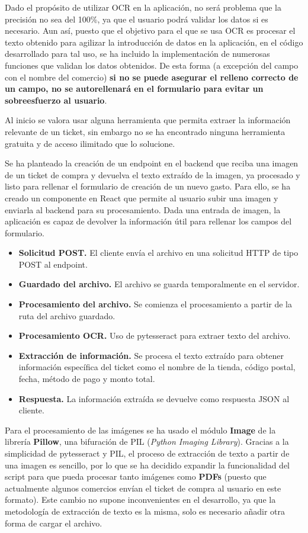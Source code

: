 Dado el propósito de utilizar OCR en la aplicación, no será problema que la precisión no sea del 100\%, ya que el usuario podrá validar los datos si es necesario. Aun así, puesto que el objetivo para el que se usa OCR es procesar el texto obtenido para agilizar la introducción de datos en la aplicación, en el código desarrollado para tal uso, se ha incluido la implementación de numerosas funciones que validan los datos obtenidos. De esta forma (a excepción del campo con el nombre del comercio) \textbf{si no se puede asegurar el relleno correcto de un campo, no se autorellenará en el formulario para evitar un sobreesfuerzo al usuario}.


Al inicio se valora usar alguna herramienta que permita extraer la información relevante de un ticket, sin embargo no se ha encontrado ninguna herramienta gratuita y de acceso ilimitado que lo solucione. 

Se ha planteado la creación de un endpoint en el backend que reciba una imagen de un ticket de compra y devuelva el texto extraído de la imagen, ya procesado y listo para rellenar el formulario de creación de un nuevo gasto. Para ello, se ha creado un componente en React que permite al usuario subir una imagen y enviarla al backend para su procesamiento. Dada una entrada de imagen, la aplicación es capaz de devolver la información útil para rellenar los campos del formulario.

\begin{itemize}
    \item \textbf{Solicitud POST.} El cliente envía el archivo en una solicitud HTTP de tipo POST al endpoint.
    \item \textbf{Guardado del archivo.} El archivo se guarda temporalmente en el servidor.
    \item \textbf{Procesamiento del archivo.} Se comienza el procesamiento a partir de la ruta del archivo guardado.
    \item \textbf{Procesamiento OCR.} Uso de pytesseract para extraer texto del archivo.
    \item \textbf{Extracción de información.} Se procesa el texto extraído para obtener información específica del ticket como el nombre de la tienda, código postal, fecha, método de pago y monto total.
    \item \textbf{Respuesta.} La información extraída se devuelve como respuesta JSON al cliente.
\end{itemize}

Para el procesamiento de las imágenes se ha usado el módulo \textbf{Image} de la librería \textbf{Pillow}, una bifuración de PIL (\textit{Python Imaging Library})\cite{rodrigues202440}. Gracias a la simplicidad de pytesseract y PIL, el proceso de extracción de texto a partir de una imagen es sencillo, por lo que se ha decidido expandir la funcionalidad del script para que pueda procesar tanto imágenes como \textbf{PDFs} (puesto que actualmente algunos comercios envían el ticket de compra al usuario en este formato). Este cambio no supone inconvenientes en el desarrollo, ya que la metodología de extracción de texto es la misma, solo es necesario añadir otra forma de cargar el archivo.

